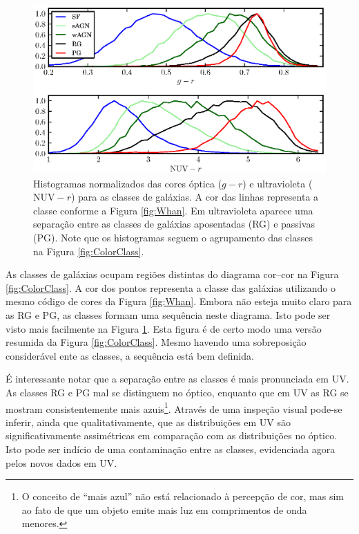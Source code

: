 \begin{figure}
	\includegraphics{figuras/histo_galtype_color.eps}
	\caption[Histogramas de cores para as classes de galáxias.]
	{Histogramas normalizados das cores óptica ($g-r$) e ultravioleta
	($\mathrm{NUV}-r$) para as classes de galáxias. A cor das linhas representa a
	classe conforme a Figura \ref{fig:Whan}. Em ultravioleta aparece uma separação
	entre as classes de galáxias aposentadas (RG) e passivas (PG). Note que os
	histogramas seguem o agrupamento das classes na Figura
	\ref{fig:ColorClass}.}
	\label{fig:HistogramaCorClasse}
\end{figure}

As classes de galáxias ocupam regiões distintas do diagrama cor--cor na Figura
\ref{fig:ColorClass}. A cor dos pontos representa a classe das galáxias
utilizando o mesmo código de cores da Figura \ref{fig:Whan}. Embora não esteja
muito claro para as RG e PG, as classes formam uma sequência neste diagrama.
Isto pode ser visto mais facilmente na Figura \ref{fig:HistogramaCorClasse}.
Esta figura é de certo modo uma versão resumida da Figura \ref{fig:ColorClass}.
Mesmo havendo uma sobreposição considerável ente as classes, a sequência está
bem definida.

É interessante notar que a separação entre as classes é mais pronunciada em UV.
As classes RG e PG mal se distinguem no óptico, enquanto que em UV as RG se
mostram consistentemente mais azuis\footnote{O conceito de ``mais azul'' não
está relacionado à percepção de cor, mas sim ao fato de que um objeto emite mais
luz em comprimentos de onda menores.}. Através de uma inspeção visual pode-se
inferir, ainda que qualitativamente, que as distribuições em UV são
significativamente assimétricas em comparação com as distribuições no óptico.
Isto pode ser indício de uma contaminação entre as classes, evidenciada agora
pelos novos dados em UV.


